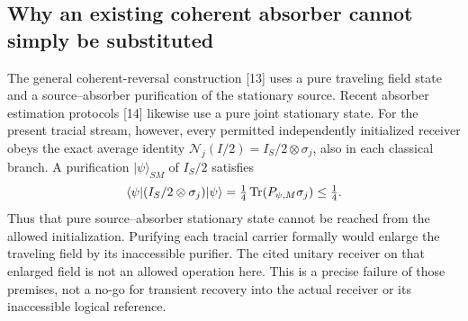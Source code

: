 \subsection{Why an existing coherent absorber cannot simply be substituted}
The general coherent-reversal construction [13] uses a pure traveling
field state and a source--absorber purification of the stationary source.
Recent absorber estimation protocols [14] likewise use a pure joint
stationary state. For the present tracial stream, however, every permitted
independently initialized receiver obeys the exact average identity
$\mathcal N_j(I/2)=I_S/2\otimes\sigma_j$, also in each classical branch.
A purification $|\psi\rangle_{SM}$ of $I_S/2$ satisfies
\[
 \langle\psi|(I_S/2\otimes\sigma_j)|\psi\rangle
 =\tfrac14\operatorname{Tr}(P_{\psi,M}\sigma_j)\le\tfrac14.
\]
Thus that pure source--absorber stationary state cannot be reached from
the allowed initialization. Purifying each tracial carrier formally would
enlarge the traveling field by its inaccessible purifier. The cited
unitary receiver on that enlarged field is not an allowed operation here.
This is a precise failure of those premises, not a no-go for transient
recovery into the actual receiver or its inaccessible logical reference.
